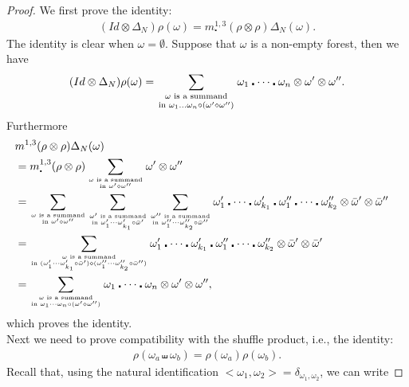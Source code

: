 \documentclass[10pt,a4paper]{article}
\begin{document}
\begin{proof}
We first prove the identity:
\begin{align*}
(Id \otimes \Delta_N)\rho(\omega)=m_\centerdot^{1,3}(\rho \otimes \rho)\Delta_N(\omega).
\end{align*}
The identity is clear when $\omega = \emptyset$. Suppose that $\omega$ is a non-empty forest, then we have
\begin{align*}
(Id \otimes \Delta_N)\rho(\omega)=\sum_{\substack{\omega \text{ is a summand} \atop \text{in } \omega_1\dots \omega_n \circ (\omega' \diamond \omega'') }} \omega_1 \centerdot \dots \centerdot \omega_n \otimes \omega' \otimes \omega''.
\end{align*}
Furthermore
\begin{align*}
\lefteqn{m^{1,3}(\rho \otimes \rho)\Delta_N(\omega)}\\
&= 
m_\centerdot^{1,3}(\rho \otimes \rho)
\sum_{\omega \text{ is a summand} \atop \text{in } \omega' \diamond \omega''} \omega' \otimes \omega'' \\
&=
\sum_{\omega \text{ is a summand} \atop \text{in } \omega' \diamond \omega''}
\sum_{{\omega' \text{ is a summand} \atop \text{in } \omega_1' \cdots \omega_{k_1}' \circ \bar{\omega}'}}\sum_{{\omega'' \text{ is a summand} \atop \text{in } \omega_1'' \cdots \omega_{k_2}'' \circ \bar{\omega}''}} \omega_1' \centerdot \cdots \centerdot \omega_{k_1}' \centerdot \omega_1'' \centerdot \cdots \centerdot \omega_{k_2}'' \otimes \bar{\omega}' \otimes \bar{\omega}'' \\
&=\sum_{{\omega \text{ is a summand} \atop \text{in } (\omega_1' \cdots \omega_{k_1}' \circ \bar{\omega}') \diamond (\omega_1'' \cdots \omega_{k_2}'' \circ \bar{\omega}'')}} \omega_1' \centerdot \cdots \centerdot \omega_{k_1}' \centerdot \omega_1'' \centerdot \cdots \centerdot \omega_{k_2}'' \otimes \bar{\omega}' \otimes \bar{\omega}' \\
&=\sum_{{\omega \text{ is a summand} \atop \text{in } \omega_1\cdots \omega_n \circ (\omega' \diamond \omega'') }} \omega_1 \centerdot \cdots \centerdot \omega_n \otimes \omega' \otimes \omega'',
\end{align*}
which proves the identity. \\
Next we need to prove compatibility with the shuffle product, i.e., the identity:
\begin{align*}
\rho(\omega_a \shuffle \omega_b)=\rho(\omega_a) \rho(\omega_b).
\end{align*}
Recall that, using the natural identification $<\omega_1,\omega_2>=\delta_{\omega_1,\omega_2}$, we can write 

\end{proof}
\end{document}
